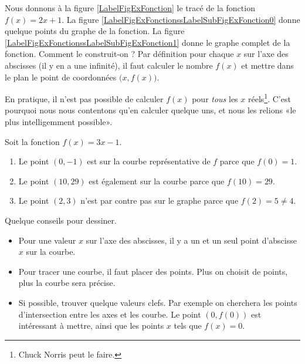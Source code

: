 \newcommand{\CaptionFigExFonction}{Comment tracer la fonction \( f(x)=2x+1\) ?}


Nous donnons à la figure \ref{LabelFigExFonction} le tracé de la fonction \( f(x)=2x+1\). La figure \ref{LabelFigExFonctionssLabelSubFigExFonction0} donne quelque points du graphe de la fonction. La figure \ref{LabelFigExFonctionssLabelSubFigExFonction1} donne le graphe complet de la fonction. Comment le construit-on ? Par définition pour chaque \( x\) sur l'axe des abscisses (il y en a une infinité), il faut calculer le nombre \( f(x)\) et mettre dans le plan le point de coordonnées \( \big( x,f(x) \big)\).

En pratique, il n'est pas possible de calculer \( f(x)\) pour \emph{tous} les \( x\) réels\footnote{Chuck Norris peut le faire.}. C'est pourquoi nous nous contentons qu'en calculer quelque uns, et nous les relions «le plus intelligemment possible».

\begin{example}
    Soit la fonction \( f(x)=3x-1\).
    \begin{enumerate}
        \item
            Le point \( (0,-1)\) est sur la courbe représentative de \( f\) parce que \( f(0)=1\).
        \item
            Le point \( (10,29)\) est également sur la courbe parce que \( f(10)=29\).
        \item
            Le point \( (2,3)\) n'est par contre pas sur le graphe parce que \( f(2)=5\neq 4\).
    \end{enumerate}
\end{example}

Quelque conseils pour dessiner.
\begin{itemize}
    \item
        Pour une valeur $x$ sur l'axe des abscisses, il y a un et un seul point d'abscisse $x$ sur la courbe.
    \item
        Pour tracer une courbe, il faut placer des points. Plus on choisit de points, plus la courbe sera précise.
    \item
        Si possible, trouver quelque valeurs clefs. Par exemple on cherchera les points d'intersection entre les axes et les courbe. Le point \( (0,f(0)) \) est intéressant à mettre, ainsi que les points \( x\) tels que \( f(x)=0\).
\end{itemize}

